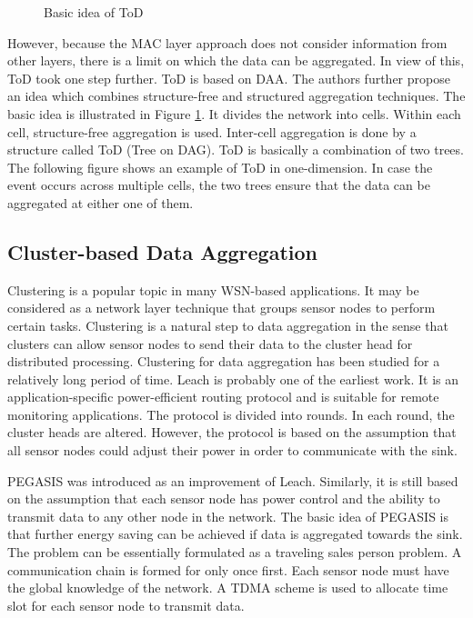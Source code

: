 \begin{figure}
\centering
{}
\caption{Basic idea of ToD}
\label{fig:ToD}
\end{figure}

However, because the MAC layer approach does not consider information from other layers, there is a limit on which the data can be aggregated. In view of this, ToD \cite{tod} took one step further. ToD is based on DAA. The authors further propose an idea which combines structure-free and structured aggregation techniques. The basic idea is illustrated in Figure \ref{fig:ToD}. It divides the network into cells. Within each cell, structure-free aggregation is used. Inter-cell aggregation is done by a structure called ToD (Tree on DAG). ToD is basically a combination of two trees. The following figure shows an example of ToD in one-dimension. In case the event occurs across multiple cells, the two trees ensure that the data can be aggregated at either one of them.

\subsection{Cluster-based Data Aggregation}
Clustering is a popular topic in many WSN-based applications. It may be considered as a network layer technique that groups sensor nodes to perform certain tasks. Clustering is a natural step to data aggregation in the sense that clusters can allow sensor nodes to send their data to the cluster head for distributed processing. Clustering for data aggregation has been studied for a relatively long period of time. Leach \cite{leach} is probably one of the earliest work. It is an application-specific power-efficient routing protocol and is suitable for remote monitoring applications. The protocol is divided into rounds. In each round, the cluster heads are altered. However, the protocol is based on the assumption that all sensor nodes could adjust their power in order to communicate with the sink.

PEGASIS \cite{pegasis} was introduced as an improvement of Leach. Similarly, it is still based on the assumption that each sensor node has power control and the ability to transmit data to any other node in the network. The basic idea of PEGASIS is that further energy saving can be achieved if data is aggregated towards the sink. The problem can be essentially formulated as a traveling sales person problem. A communication chain is formed for only once first. Each sensor node must have the global knowledge of the network. A TDMA scheme is used to allocate time slot for each sensor node to transmit data.

